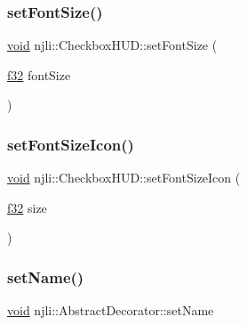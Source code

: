 \mbox{\label{classnjli_1_1_checkbox_h_u_d_a4063a85d6fb9bc70311171465efa7025}} 
\subsubsection{\texorpdfstring{set\+Font\+Size()}{setFontSize()}}
{\footnotesize\ttfamily \mbox{\hyperlink{_thread_8h_af1e856da2e658414cb2456cb6f7ebc66}{void}} njli\+::\+Checkbox\+H\+U\+D\+::set\+Font\+Size (\begin{DoxyParamCaption}\item[{\mbox{\hyperlink{_util_8h_a5f6906312a689f27d70e9d086649d3fd}{f32}}}]{font\+Size }\end{DoxyParamCaption})}

\mbox{\label{classnjli_1_1_checkbox_h_u_d_a4b88a46f30ab4675d3f9d2e14ca59a6f}} 
\subsubsection{\texorpdfstring{set\+Font\+Size\+Icon()}{setFontSizeIcon()}}
{\footnotesize\ttfamily \mbox{\hyperlink{_thread_8h_af1e856da2e658414cb2456cb6f7ebc66}{void}} njli\+::\+Checkbox\+H\+U\+D\+::set\+Font\+Size\+Icon (\begin{DoxyParamCaption}\item[{\mbox{\hyperlink{_util_8h_a5f6906312a689f27d70e9d086649d3fd}{f32}}}]{size }\end{DoxyParamCaption})}

\mbox{\label{classnjli_1_1_checkbox_h_u_d_a087eb5f8d9f51cc476f12f1d10a3cb95}} 
\subsubsection{\texorpdfstring{set\+Name()}{setName()}}
{\footnotesize\ttfamily \mbox{\hyperlink{_thread_8h_af1e856da2e658414cb2456cb6f7ebc66}{void}} njli\+::\+Abstract\+Decorator\+::set\+Name}

